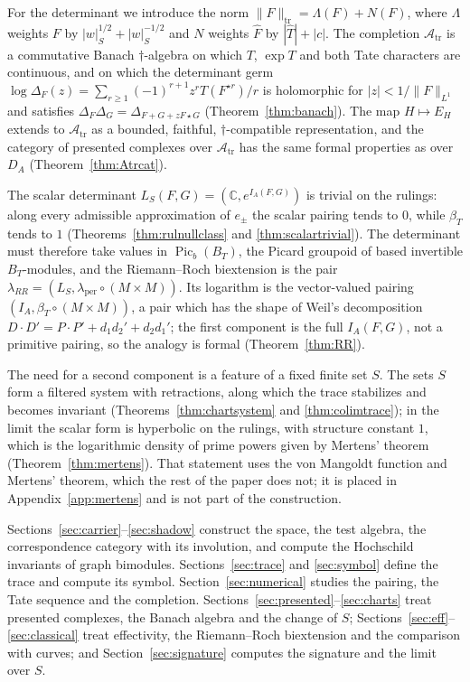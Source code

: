 \documentclass[11pt]{amsart}
\theoremstyle{definition}
\theoremstyle{remark}
\newcommand{\C}{\mathbb C}
\newcommand{\Picb}{\operatorname{Pic}_{b}}
\newcommand{\Atr}{\mathcal A_{\mathrm{tr}}}
\begin{document}
For the determinant we introduce the norm
$\lVert F\rVert_{\mathrm{tr}}=\Lambda(F)+N(F)$, where $\Lambda$ weights $F$ by
$|w|_S^{1/2}+|w|_S^{-1/2}$ and $N$ weights $\widehat F$ by $|\widehat
T|+|c|$.  The completion $\Atr$ is a commutative Banach $\dagger$-algebra on
which $T$, $\exp T$ and both Tate characters are continuous, and on which the
determinant germ
$\log\Delta_F(z)=\sum_{r\ge1}(-1)^{r+1}z^{r}T(F^{\star r})/r$ is holomorphic
for $|z|<1/\lVert F\rVert_{L^1}$ and satisfies
$\Delta_F\Delta_G=\Delta_{F+G+zF\star G}$ (Theorem~\ref{thm:banach}).  The
map $H\mapsto E_H$ extends to $\Atr$ as a bounded, faithful,
$\dagger$-compatible representation, and the category of presented complexes
over $\Atr$ has the same formal properties as over $D_A$
(Theorem~\ref{thm:Atrcat}).

The scalar determinant $L_S(F,G)=(\C,e^{I_A(F,G)})$ is trivial on the
rulings: along every admissible approximation of $e_{\pm}$ the scalar pairing
tends to $0$, while $\beta_T$ tends to $1$ (Theorems~\ref{thm:rulnullclass}
and \ref{thm:scalartrivial}).  The determinant must therefore take values in
$\Picb(B_T)$, the Picard groupoid of based invertible $B_T$-modules, and the
Riemann--Roch biextension is the pair
$\lambda_{RR}=(L_S,\lambda_{\mathrm{per}}\circ(M\times M))$.  Its logarithm is
the vector-valued pairing $(I_A,\beta_T\circ(M\times M))$, a pair which has
the shape of Weil's decomposition $D\cdot D'=P\cdot P'+d_1d_2'+d_2d_1'$; the
first component is the full $I_A(F,G)$, not a primitive pairing, so the
analogy is formal (Theorem~\ref{thm:RR}).

The need for a second component is a feature of a fixed finite set $S$.  The
sets $S$ form a filtered system with retractions, along which the trace
stabilizes and becomes invariant (Theorems~\ref{thm:chartsystem} and
\ref{thm:colimtrace}); in the limit the scalar form is hyperbolic on the
rulings, with structure constant $1$, which is the logarithmic density of
prime powers given by Mertens' theorem (Theorem~\ref{thm:mertens}).  That
statement uses the von Mangoldt function and Mertens' theorem, which the rest
of the paper does not; it is placed in Appendix~\ref{app:mertens} and is not
part of the construction.

Sections~\ref{sec:carrier}--\ref{sec:shadow} construct the space, the test
algebra, the correspondence category with its involution, and compute the
Hochschild invariants of graph bimodules.  Sections~\ref{sec:trace} and
\ref{sec:symbol} define the trace and compute its symbol.
Section~\ref{sec:numerical} studies the pairing, the Tate sequence and the
completion.  Sections~\ref{sec:presented}--\ref{sec:charts} treat presented
complexes, the Banach algebra and the change of $S$;
Sections~\ref{sec:eff}--\ref{sec:classical} treat effectivity, the
Riemann--Roch biextension and the comparison with curves; and
Section~\ref{sec:signature} computes the signature and the limit over $S$.
\end{document}
